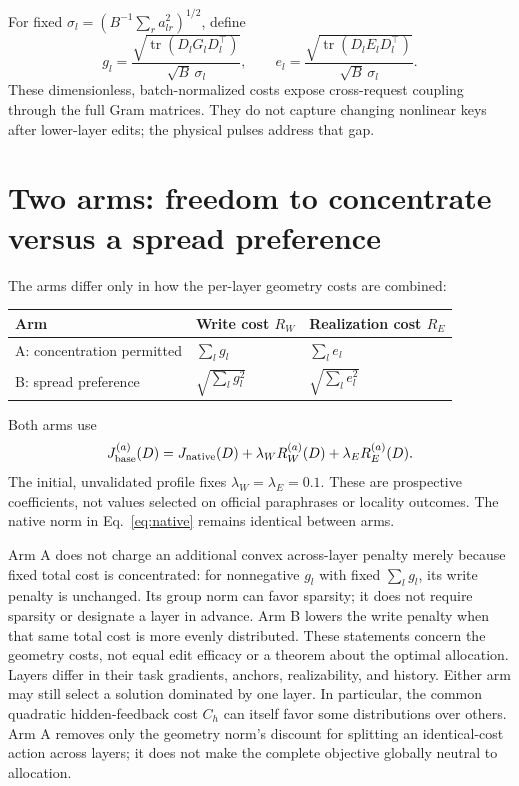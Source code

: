\documentclass[10pt]{article}
\newcommand{\tr}{\operatorname{tr}}
\begin{document}
For fixed $\sigma_l=(B^{-1}\sum_r a_{lr}^2)^{1/2}$, define
\[
 g_l=\frac{\sqrt{\tr(D_lG_lD_l^\top)}}{\sqrt B\,\sigma_l},
 \qquad
 e_l=\frac{\sqrt{\tr(D_lE_lD_l^\top)}}{\sqrt B\,\sigma_l}.
\]
These dimensionless, batch-normalized costs expose cross-request coupling
through the full Gram matrices. They do not capture changing nonlinear
keys after lower-layer edits; the physical pulses address that gap.

\newpage
\section{Two arms: freedom to concentrate versus a spread preference}
The arms differ only in how the per-layer geometry costs are combined:
\begin{center}
\begin{tabular}{lll}
\toprule
Arm & Write cost $R_W$ & Realization cost $R_E$\\
\midrule
A: concentration permitted & $\sum_l g_l$ & $\sum_l e_l$\\
B: spread preference & $\sqrt{\sum_l g_l^2}$ & $\sqrt{\sum_l e_l^2}$\\
\bottomrule
\end{tabular}
\end{center}
Both arms use
\[
 J_{\rm base}^{(a)}(D)=J_{\rm native}(D)
 +\lambda_W R_W^{(a)}(D)+\lambda_E R_E^{(a)}(D).
 \label{eq:base}
\]
The initial, unvalidated profile fixes $\lambda_W=\lambda_E=0.1$.
These are prospective coefficients, not values selected on official
paraphrases or locality outcomes. The native norm in Eq.~\eqref{eq:native}
remains identical between arms.

Arm A does not charge an additional convex across-layer penalty merely
because fixed total cost is concentrated: for nonnegative $g_l$ with
fixed $\sum_lg_l$, its write penalty is unchanged. Its group norm can
favor sparsity; it does not require sparsity or designate a layer in
advance. Arm B lowers the write penalty when that same total cost is
more evenly distributed. These statements concern the geometry costs,
not equal edit efficacy or a theorem about the optimal allocation.
Layers differ in their task gradients, anchors, realizability, and
history. Either arm may still select a solution dominated by one layer.
In particular, the common quadratic hidden-feedback cost $C_h$ can itself
favor some distributions over others. Arm A removes only the geometry
norm's discount for splitting an identical-cost action across layers;
it does not make the complete objective globally neutral to allocation.
\end{document}
